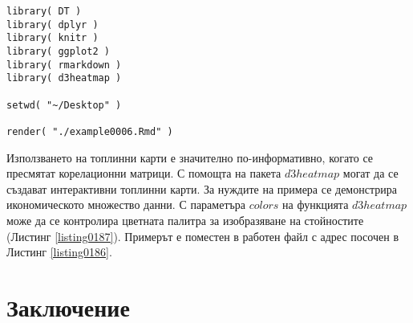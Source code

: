 \begin{lstlisting}[caption=Създаване на интерактивни документи, label=listing0187]
library( DT )
library( dplyr )
library( knitr )
library( ggplot2 )
library( rmarkdown )
library( d3heatmap )

setwd( "~/Desktop" )

render( "./example0006.Rmd" )
\end{lstlisting}

Използването на топлинни карти е значително по-информативно, когато се пресмятат корелационни матрици. С помощта на пакета $d3heatmap$ могат да се създават интерактивни топлинни карти. За нуждите на примера се демонстрира икономическото множество данни. С параметъра $colors$ на функцията $d3heatmap$ може да се контролира цветната палитра за изобразяване на стойностите (Листинг \ref{listing0187}). Примерът е поместен в работен файл с адрес посочен в Листинг \ref{listing0186}.

\section*{Заключение}


